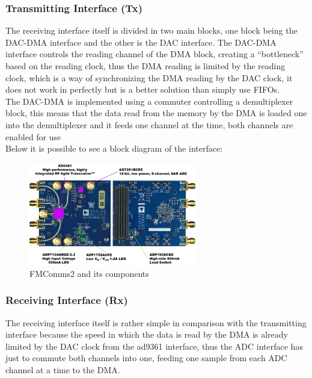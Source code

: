 \subsubsection{Transmitting Interface (Tx)}

The receiving interface itself is divided in two main blocks, one block being the
DAC-DMA interface and the other is the DAC interface. The DAC-DMA interface controls
the reading channel of the DMA block, creating a “bottleneck” based on the reading
clock, thus the DMA reading is limited by the reading clock, which is a way of
synchronizing the DMA reading by the DAC clock, it does not work in perfectly but
is a better solution than simply use FIFOs. \\

The DAC-DMA is implemented using a commuter controlling a demultiplexer block,
this means that the data read from the memory by the DMA is loaded one into the
demultiplexer and it feeds one channel at the time, both channels are enabled
for use\\

Below it is possible to see a block diagram of the interface:

\begin{figure}[htbp]
    \centering
    \includegraphics[width=0.65\textwidth]{./figures/fmcomms2_pic}
    \caption{ FMComms2 and its components
    \label{fig:fmcomm}}
\end{figure}

\subsubsection{Receiving Interface (Rx)}

The receiving interface itself is rather simple in comparison with the transmitting
interface because the speed in which the data is read by the DMA is already limited
by the DAC clock from the ad9361 interface, thus the ADC interface has just to commute
both channels into one, feeding one sample from each ADC channel at a time to the DMA.\\

